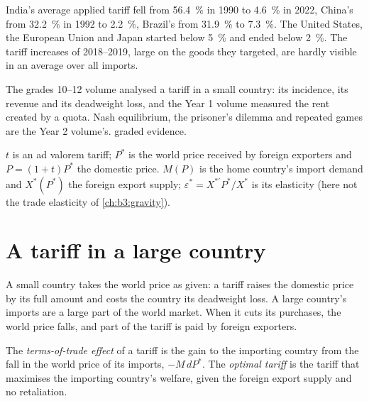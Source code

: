 India's average applied tariff fell from 56.4~\% in 1990 to 4.6~\% in 2022, China's
from 32.2~\% in 1992 to 2.2~\%, Brazil's from 31.9~\% to 7.3~\%. The United States, the
European Union and Japan started below 5~\% and ended below 2~\%. The tariff
increases of 2018--2019, large on the goods they targeted, are hardly visible in an
average over all imports.

\begin{recall}
The grades 10--12 volume analysed a tariff in a small country: its incidence,
its revenue and its deadweight loss, and the Year 1 volume measured the rent
created by a quota. Nash equilibrium, the prisoner's dilemma and repeated games
are the Year 2 volume's.  graded evidence.
\end{recall}

\begin{notation}\label{not:b3:trade-policy:symbols}
$t$ is an ad valorem tariff; $P^*$ is the world price received by foreign exporters
and $P = (1 + t)P^*$ the domestic price. $M(P)$ is the home country's import demand
and $X^*(P^*)$ the foreign export supply; $\varepsilon^* = X^{*\prime}P^*/X^*$ is its elasticity
(here not the trade elasticity of \cref{ch:b3:gravity}).
\end{notation}

\section{A tariff in a large country}\label{sec:b3:trade-policy:large}

A small country takes the world price as given: a tariff raises the domestic
price by its full amount and costs the country its deadweight loss. A large
country's imports are a large part of the world market. When it cuts its
purchases, the world price falls, and part of the tariff is paid by foreign
exporters.

\begin{definition}\label{def:b3:trade-policy:optimal-tariff}
The \emph{terms-of-trade effect} of a tariff is the gain to the importing country
from the fall in the world price of its imports, $-M\,dP^*$. The \emph{optimal
tariff} is the tariff that maximises the importing country's welfare, given the
foreign export supply and no retaliation.
\end{definition}

